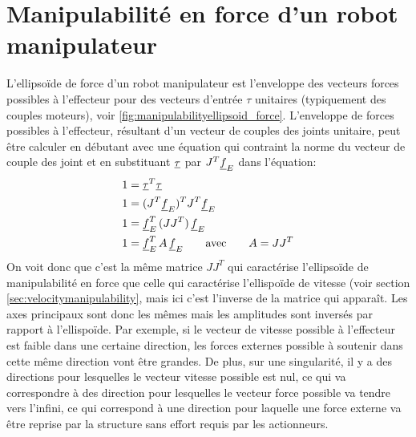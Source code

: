 


\newpage
\section{Manipulabilité en force d'un robot manipulateur}
\label{sec:manipforceelipse}

L'ellipsoïde de force d'un robot manipulateur est l'enveloppe des vecteurs forces possibles à l'effecteur pour des vecteurs d'entrée $\tau$ unitaires (typiquement des couples moteurs), voir \ref{fig:manipulabilityellipsoid_force}. L'enveloppe de forces possibles à l'effecteur, résultant d'un vecteur de couples des joints unitaire, peut être calculer en débutant avec une équation qui contraint la norme du vecteur de couple des joint et en substituant $\underline{\tau}$ par $J^{T} \underline{f}_E$ dans l'équation:
\begin{align}
1 &= \underline{\tau}^T \underline{\tau} \\
1 &= (J^{T} \underline{f}_E)^T J^{T} \underline{f}_E \\
1 &= \underline{f}_E^T \, (J J^{T} ) \, \underline{f}_E \\
1 &= \underline{f}_E^T  \, A \, \underline{f}_E \quad\quad \text{avec} \quad\quad A = J J^T
\end{align} 
On voit donc que c'est la même matrice $J J^T$ qui caractérise l'ellipsoïde de manipulabilité en force que celle qui caractérise l'ellispoïde de vitesse (voir section \ref{sec:velocitymanipulability}, mais ici c'est l'inverse de la matrice qui apparaît. Les axes principaux sont donc les mêmes mais les amplitudes sont inversés par rapport à l'ellispoïde. Par exemple, si le vecteur de vitesse possible à l'effecteur est faible dans une certaine direction, les forces externes possible à soutenir dans cette même direction vont être grandes. De plus, sur une singularité, il y a des directions pour lesquelles le vecteur vitesse possible est nul, ce qui va correspondre à des direction pour lesquelles le vecteur force possible va tendre vers l'infini, ce qui correspond à une direction pour laquelle une force externe va être reprise par la structure sans effort requis par les actionneurs.

